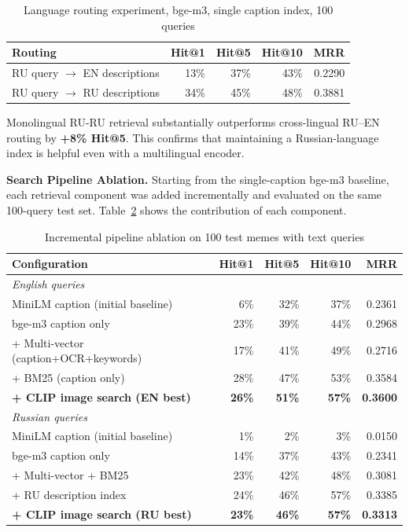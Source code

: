 \documentclass[a4paper,12pt]{article}
\begin{document}
\begin{table}[H]
\centering
\caption{Language routing experiment, bge-m3, single caption index, 100 queries}
\label{tab:routing}
\begin{tabular}{|l|r|r|r|r|}
\hline
\textbf{Routing} & \textbf{Hit@1} & \textbf{Hit@5} & \textbf{Hit@10} & \textbf{MRR} \\
\hline
RU query $\to$ EN descriptions & 13\% & 37\% & 43\% & 0.2290 \\
\hline
RU query $\to$ RU descriptions & 34\% & 45\% & 48\% & 0.3881 \\
\hline
\end{tabular}
\end{table}

Monolingual RU-RU retrieval substantially outperforms cross-lingual RU--EN routing by \textbf{+8\% Hit@5}. This confirms that maintaining a Russian-language index is helpful even with a multilingual encoder.

\textbf{Search Pipeline Ablation.}
\label{sec:ablation}
Starting from the single-caption bge-m3 baseline, each retrieval component was added incrementally and evaluated on the same 100-query test set. Table~\ref{tab:ablation} shows the contribution of each component.

\begin{table}[H]
\centering
\caption{Incremental pipeline ablation on 100 test memes with text queries}
\label{tab:ablation}
\begin{tabular}{|l|r|r|r|r|}
\hline
\textbf{Configuration} & \textbf{Hit@1} & \textbf{Hit@5} & \textbf{Hit@10} & \textbf{MRR} \\
\hline
\multicolumn{5}{|l|}{\textit{English queries}} \\
\hline
MiniLM caption (initial baseline) & 6\% & 32\% & 37\% & 0.2361 \\
\hline
bge-m3 caption only & 23\% & 39\% & 44\% & 0.2968 \\
\hline
+ Multi-vector (caption+OCR+keywords) & 17\% & 41\% & 49\% & 0.2716 \\
\hline
+ BM25 (caption only) & 28\% & 47\% & 53\% & 0.3584 \\
\hline
\textbf{+ CLIP image search (EN best)} & \textbf{26\%} & \textbf{51\%} & \textbf{57\%} & \textbf{0.3600} \\
\hline
\multicolumn{5}{|l|}{\textit{Russian queries}} \\
\hline
MiniLM caption (initial baseline) & 1\% & 2\% & 3\% & 0.0150 \\
\hline
bge-m3 caption only & 14\% & 37\% & 43\% & 0.2341 \\
\hline
+ Multi-vector + BM25 & 23\% & 42\% & 48\% & 0.3081 \\
\hline
+ RU description index & 24\% & 46\% & 57\% & 0.3385 \\
\hline
\textbf{+ CLIP image search (RU best)} & \textbf{23\%} & \textbf{46\%} & \textbf{57\%} & \textbf{0.3313} \\
\hline
\end{tabular}
\end{table}
\end{document}
